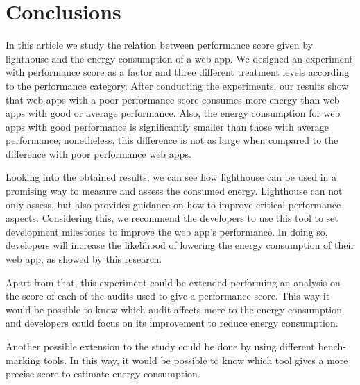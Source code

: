 \section{Conclusions}\label{sec:conclusions}

In this article we study the relation between performance score given by lighthouse and the energy consumption of a web app. We designed an experiment with performance score as a factor and three different treatment levels according to the performance category. After conducting the experiments, our results show that web apps with a poor performance score consumes more energy than web apps with good or average performance. Also, the energy consumption for web apps with good performance is significantly smaller than those with average performance; nonetheless, this difference is not as large when compared to the difference with poor performance web apps. \newline 

Looking into the obtained results, we can see how lighthouse can be used in a promising way to measure and assess the consumed energy. Lighthouse can not only assess, but also provides guidance on how to improve critical performance aspects. Considering this, we recommend the developers to use this tool to set development milestones to improve the web app's performance. In doing so,  developers will increase the likelihood of lowering the energy consumption of their web app, as showed by this research.
\newline

Apart from that, this experiment could be extended performing an analysis on the score of each of the audits used to give a performance score. This way it would be possible to know which audit affects more to the energy consumption and developers could focus on its improvement to reduce energy consumption. \newline

Another possible extension to the study could be done by using different bench-marking tools. In this way, it would be possible to know which tool gives a more precise score to estimate energy consumption.
